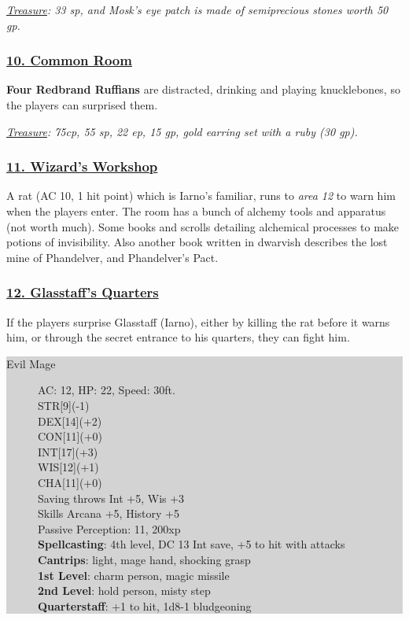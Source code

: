 \emph{\underline{Treasure}: 33 sp, and Mosk's eye patch is made of semiprecious stones worth 50 gp.}

\subsubsection*{\underline{10. Common Room}}
\textbf{Four Redbrand Ruffians} are distracted, drinking and playing knucklebones, so the players can surprised them.

\emph{\underline{Treasure}: 75cp, 55 sp, 22 ep, 15 gp, gold earring set with a ruby (30 gp).}

\subsubsection*{\underline{11. Wizard's Workshop}}
A rat (AC 10, 1 hit point) which is Iarno's familiar, runs to \emph{area 12} to warn him when the players enter. The room has a bunch of alchemy tools and apparatus (not worth much). Some books and scrolls detailing alchemical processes to make potions of invisibility. Also another book written in dwarvish describes the lost mine of Phandelver, and Phandelver's Pact.

\subsubsection*{\underline{12. Glasstaff's Quarters}}
If the players surprise Glasstaff (Iarno), either by killing the rat before it warns him, or through the secret entrance to his quarters, they can fight him.

\colorbox{lightgray}{\begin{minipage}{0.4\textwidth}
		\begin{description}
			\item[Evil Mage]
			AC: 12, HP: 22, Speed: 30ft.
			\\ STR[9](-1) 
			\\ DEX[14](+2)
			\\ CON[11](+0)
			\\ INT[17](+3)
			\\ WIS[12](+1)
			\\ CHA[11](+0)
			\\ Saving throws Int +5, Wis +3
			\\ Skills Arcana +5, History +5
			\\ Passive Perception: 11, 200xp
			\\ \textbf{Spellcasting}: 4th level, DC 13 Int save, +5 to hit with attacks
			\\ \textbf{Cantrips}: light, mage hand, shocking grasp
			\\ \textbf{1st Level}: charm person, magic missile
			\\ \textbf{2nd Level}: hold person, misty step
			\\ \textbf{Quarterstaff}: +1 to hit, 1d8-1 bludgeoning 
		\end{description}
\end{minipage}}
\break

